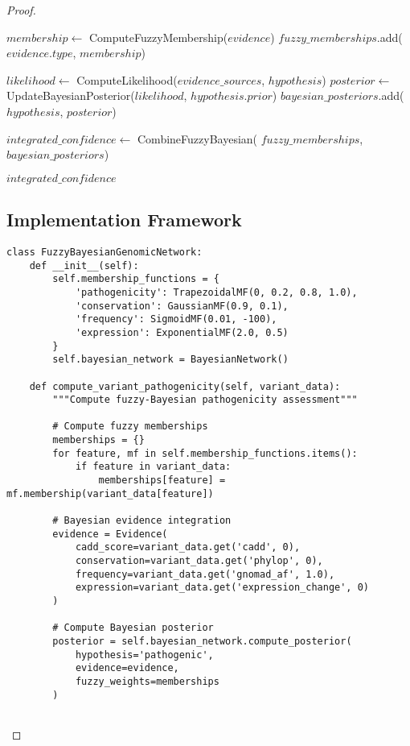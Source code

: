 \documentclass[12pt,a4paper]{article}
\begin{document}
\begin{proof}
\begin{algorithm}
\begin{algorithmic}
        \State $membership \gets$ ComputeFuzzyMembership($evidence$)
        \State $fuzzy\_memberships$.add($evidence.type$, $membership$)
    \EndFor
    
        \State $likelihood \gets$ ComputeLikelihood($evidence\_sources$, $hypothesis$)
        \State $posterior \gets$ UpdateBayesianPosterior($likelihood$, $hypothesis.prior$)
        \State $bayesian\_posteriors$.add($hypothesis$, $posterior$)
    \EndFor
    
    \State $integrated\_confidence \gets$ CombineFuzzyBayesian(
        $fuzzy\_memberships$, $bayesian\_posteriors$)
    
    \State \Return $integrated\_confidence$
\EndProcedure
\end{algorithmic}
\end{algorithm}

\subsection{Implementation Framework}

\begin{lstlisting}[style=pythonstyle, caption=Fuzzy-Bayesian Network Implementation]
class FuzzyBayesianGenomicNetwork:
    def __init__(self):
        self.membership_functions = {
            'pathogenicity': TrapezoidalMF(0, 0.2, 0.8, 1.0),
            'conservation': GaussianMF(0.9, 0.1),
            'frequency': SigmoidMF(0.01, -100),
            'expression': ExponentialMF(2.0, 0.5)
        }
        self.bayesian_network = BayesianNetwork()
        
    def compute_variant_pathogenicity(self, variant_data):
        """Compute fuzzy-Bayesian pathogenicity assessment"""
        
        # Compute fuzzy memberships
        memberships = {}
        for feature, mf in self.membership_functions.items():
            if feature in variant_data:
                memberships[feature] = mf.membership(variant_data[feature])
        
        # Bayesian evidence integration
        evidence = Evidence(
            cadd_score=variant_data.get('cadd', 0),
            conservation=variant_data.get('phylop', 0),
            frequency=variant_data.get('gnomad_af', 1.0),
            expression=variant_data.get('expression_change', 0)
        )
        
        # Compute Bayesian posterior
        posterior = self.bayesian_network.compute_posterior(
            hypothesis='pathogenic',
            evidence=evidence,
            fuzzy_weights=memberships
        )
        

\end{lstlisting}
\end{proof}
\end{document}
